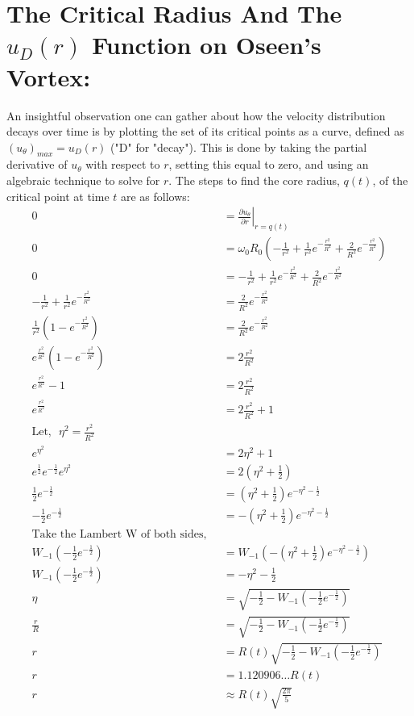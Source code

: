 \documentclass{article}
\begin{document}
\section{The Critical Radius And The $u_{D}(r)$ Function on Oseen's Vortex:}
An insightful observation one can gather about how the velocity distribution decays over time is by plotting the set of its critical points as a curve, defined as $\left( u_\theta \right)_{max}=u_D(r)$ ("D" for "decay"). This is done by taking the partial derivative of $u_\theta$ with respect to $r$, setting this equal to zero, and using an algebraic technique to solve for $r$. The steps to find the core radius, $q(t)$, of the critical point at time $t$ are as follows:
\begin{align*} 
0&= \left. \frac{\partial u_\theta}{\partial r}\right|_{r=q(t)}\\
0&=\omega _0R_0\left(-\frac{1}{r^2}+\frac{1}{r^2}e^{-\frac{r^2}{R^2}}+\frac{2}{R^2}e^{-\frac{r^2}{R^2}}\right) \\
0&= -\frac{1}{r^2}+\frac{1}{r^2}e^{-\frac{r^2}{R^2}}+\frac{2}{R^2}e^{-\frac{r^2}{R^2}} \\
-\frac{1}{r^2}+\frac{1}{r^2}e^{-\frac{r^2}{R^2}} &= \frac{2}{R^2}e^{-\frac{r^2}{R^2}} \\
\frac{1}{r^2}\left( 1-e^{-\frac{r^2}{R^2}}\right) &= \frac{2}{R^2}e^{-\frac{r^2}{R^2}} \\
e^{\frac{r^2}{R^2}}\left( 1-e^{-\frac{r^2}{R^2}}\right) &= 2\frac{r^2}{R^2} \\
e^{\frac{r^2}{R^2}} -1 &= 2\frac{r^2}{R^2} \\
e^{\frac{r^2}{R^2}} &= 2\frac{r^2}{R^2}+1 \\
\text{Let,}\:\:\:\eta^2=\frac{r^2}{R^2} \\
e^{\eta^2} &= 2\eta^2+1 \\
e^{\frac{1}{2}}e^{-\frac{1}{2}}e^{\eta^2} &= 2\left(\eta^2+\frac{1}{2}\right) \\
\frac{1}{2}e^{-\frac{1}{2}} &= \left(\eta^2+\frac{1}{2}\right)e^{-\eta^2-\frac{1}{2}} \\
-\frac{1}{2}e^{-\frac{1}{2}} &= -\left(\eta^2+\frac{1}{2}\right)e^{-\eta^2-\frac{1}{2}} \\
\text{Take the Lambert W of both sides,}\:\:\: \\
W_{-1}\left(-\frac{1}{2}e^{-\frac{1}{2}}\right) &= W_{-1}\left(-\left(\eta^2+\frac{1}{2}\right)e^{-\eta^2-\frac{1}{2}} \right)\\
W_{-1}\left(-\frac{1}{2}e^{-\frac{1}{2}}\right) &=-\eta^2-\frac{1}{2} \\
\eta &= \sqrt{-\frac{1}{2}- W_{-1}\left(-\frac{1}{2}e^{-\frac{1}{2}}\right) }\\
\frac{r}{R}&=\sqrt{-\frac{1}{2}- W_{-1}\left(-\frac{1}{2}e^{-\frac{1}{2}}\right) }\\
r&=R(t)\sqrt{-\frac{1}{2}- W_{-1}\left(-\frac{1}{2}e^{-\frac{1}{2}}\right) }\\
r&=1.120906\dots R(t) \\
r&\approx R(t)\sqrt{\frac{2\pi}{5}}
\end{align*}
\end{document}
